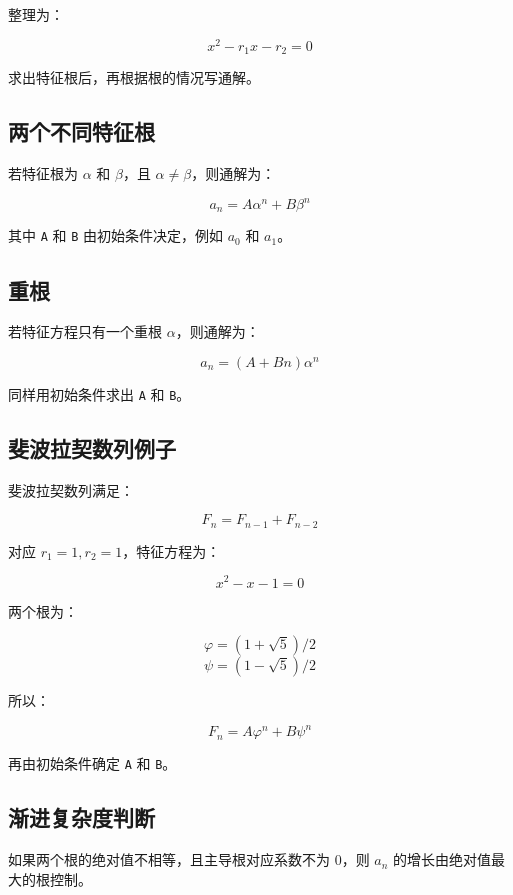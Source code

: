 \documentclass[UTF8,zihao=-4]{ctexart}
\begin{document}
整理为：

\[x^{2} - r_{1} x - r_{2} = 0\]

求出特征根后，再根据根的情况写通解。

\subsection*{两个不同特征根}

若特征根为 $\alpha$ 和 $\beta$，且 $\alpha \ne \beta$，则通解为：

\[a_{n} = A \alpha^{n} + B \beta^{n}\]

其中 \texttt{A} 和 \texttt{B} 由初始条件决定，例如 $a_0$ 和 $a_1$。

\subsection*{重根}

若特征方程只有一个重根 $\alpha$，则通解为：

\[a_{n} = (A + Bn) \alpha^{n}\]

同样用初始条件求出 \texttt{A} 和 \texttt{B}。

\subsection*{斐波拉契数列例子}

斐波拉契数列满足：

\[F_{n} = F_{n-1} + F_{n-2}\]

对应 $r_1 = 1, r_2 = 1$，特征方程为：

\[x^{2} - x - 1 = 0\]

两个根为：

\[\varphi = (1 + \sqrt{5}) / 2\]
\[\psi = (1 - \sqrt{5}) / 2\]

所以：

\[F_{n} = A \varphi^{n} + B \psi^{n}\]

再由初始条件确定 \texttt{A} 和 \texttt{B}。

\subsection*{渐进复杂度判断}

如果两个根的绝对值不相等，且主导根对应系数不为 0，则 $a_n$ 的增长由绝对值最大的根控制。
\end{document}
